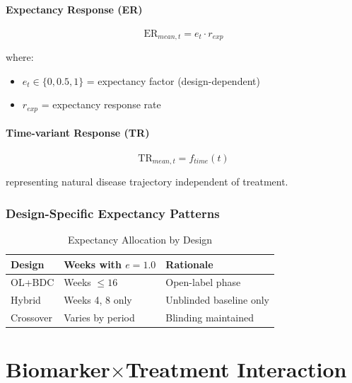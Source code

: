 \documentclass[11pt]{article}
\theoremstyle{definition}
\begin{document}
\subsection{Expectancy Response (ER)}

\begin{equation}
\text{ER}_{mean,t} = e_t \cdot r_{exp}
\end{equation}

where:
\begin{itemize}
    \item $e_t \in \{0, 0.5, 1\}$ = expectancy factor (design-dependent)
    \item $r_{exp}$ = expectancy response rate
\end{itemize}

\subsection{Time-variant Response (TR)}

\begin{equation}
\text{TR}_{mean,t} = f_{time}(t)
\end{equation}

representing natural disease trajectory independent of treatment.

\section{Design-Specific Expectancy Patterns}

\begin{table}[h]
\centering
\caption{Expectancy Allocation by Design}
\begin{tabular}{@{}lll@{}}
\toprule
\textbf{Design} & \textbf{Weeks with $e=1.0$} & \textbf{Rationale} \\
\midrule
OL+BDC & Weeks $\leq 16$ & Open-label phase \\
Hybrid & Weeks 4, 8 only & Unblinded baseline only \\
Crossover & Varies by period & Blinding maintained \\
\bottomrule
\end{tabular}
\end{table}

\part{Biomarker$\times$Treatment Interaction}
\end{document}
